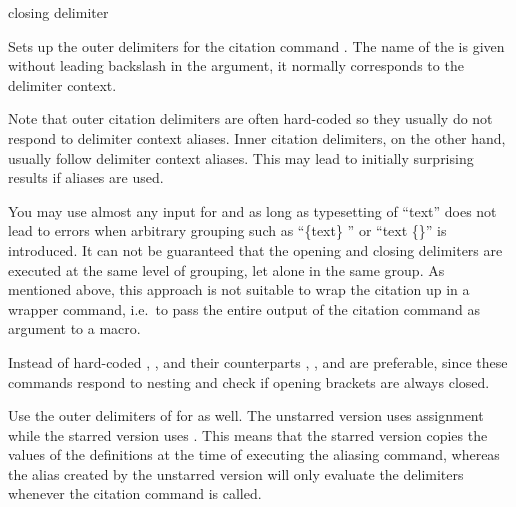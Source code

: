 \documentclass[DIV=9]{scrartcl}
\begin{document}
\begin{ltxsyntax}
        {closing delimiter}

Sets up the outer delimiters for the citation command
. The name of the 
is given without leading backslash in the argument, it normally corresponds to
the delimiter context.

Note that outer citation delimiters are often hard-coded so they usually do not
respond to delimiter context aliases.
Inner citation delimiters, on the other hand, usually follow delimiter context
aliases.
This may lead to initially surprising results if aliases are used.

You may use almost any input for  and
 as long as typesetting of
\enquote{text} does not lead to
errors when arbitrary grouping such as
\enquote{\{\allowbreak text\}\allowbreak
{}}
or \enquote{\allowbreak text\allowbreak
\{\}}
is introduced.
It can not be guaranteed that the opening and closing delimiters are executed
at the same level of grouping, let alone in the same group.
As mentioned above, this approach is not suitable to wrap the citation up in a
wrapper command, i.e.\ to pass the entire output of the citation command as
argument to a macro.

Instead of hard-coded \gencode{(}, \gencode{)}, \gencode{[} and \gencode{]}
their  counterparts , ,
 and  are preferable, since these
commands respond to nesting and check if opening brackets are always closed.


Use the outer delimiters of  for
 as well.
The unstarred version uses  assignment while the starred version uses
. This means that the starred version copies the values of the
definitions at the time of executing the aliasing command,
whereas the alias created by the unstarred version will only evaluate the
delimiters whenever the citation command is called.



\end{ltxsyntax}
\end{document}
